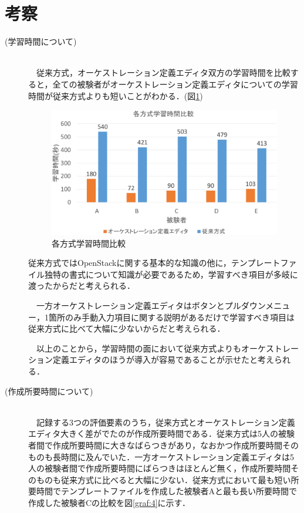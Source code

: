 \documentclass[mingoth]{kut-paper}		%
\begin{document}
	\section{考察}
	\begin{description}
		\item[(学習時間について)]\mbox{}\\ 　従来方式，オーケストレーション定義エディタ双方の学習時間を比較すると，全ての被験者がオーケストレーション定義エディタについての学習時間が従来方式よりも短いことがわかる．(図\ref{graf:8})
		
			\begin{figure}[H]
				\begin{center}
					\includegraphics[scale=0.42]{Document/studytime_all.eps}
					\caption{各方式学習時間比較}
					\label{graf:8}
				\end{center}
			\end{figure}
		従来方式ではOpenStackに関する基本的な知識の他に，テンプレートファイル独特の書式について知識が必要であるため，学習すべき項目が多岐に渡ったからだと考えられる．
		
		　一方オーケストレーション定義エディタはボタンとプルダウンメニュー，1箇所のみ手動入力項目に関する説明があるだけで学習すべき項目は従来方式に比べて大幅に少ないからだと考えられる．
		
		　以上のことから，学習時間の面において従来方式よりもオーケストレーション定義エディタのほうが導入が容易であることが示せたと考えられる．
		
		\item[(作成所要時間について)]\mbox{}\\ 　記録する3つの評価要素のうち，従来方式とオーケストレーション定義エディタ大きく差がでたのが作成所要時間である．従来方式は5人の被験者間で作成所要時間に大きなばらつきがあり，なおかつ作成所要時間そのものも長時間に及んでいた．一方オーケストレーション定義エディタは5人の被験者間で作成所要時間にばらつきはほとんど無く，作成所要時間そのものも従来方式に比べると大幅に少ない．従来方式において最も短い所要時間でテンプレートファイルを作成した被験者Aと最も長い所要時間で作成した被験者Cの比較を図\ref{graf:4}に示す．
		

\end{description}
\end{document}
